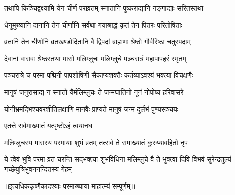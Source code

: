 \twolineshloka
{तथापि किञ्चिद्वक्ष्यामि येन चीर्ण पराव्रतम्}
{स्नातानि पुष्कराद्यानि गङ्गाद्याः सरितस्तथा} %

\twolineshloka
{धेनुमुख्यानि दानानि तेन चीर्णानि सर्वथा}
{गयाश्राद्धं कृतं तेन पितरः परितोषिताः} %

\twolineshloka
{व्रतानि तेन चीर्णानि व्रतखण्डोदितानि वै}
{द्विपदां ब्राह्मणः श्रेष्ठो गौर्वरिष्ठा चतुस्पदाम्} %

\twolineshloka
{देवानां वासवः श्रेष्ठस्तथा मासो मलिम्लुचः}
{मलिम्लुचे पञ्चरात्रं महापापहरं स्मृतम्} %

\twolineshloka
{पञ्चरात्रे च परमा पद्मिनी पापशोषिणी}
{सैकाप्यशक्तैः कर्तव्याऽवश्यं भक्त्या विचक्षणैः} %

\twolineshloka
{मानुषं जनुरासाद्य न स्नातो यैर्मलिम्लुचः}
{ते जन्मघातिनो नूनं नोपोष्य हरिवासरे} %

\twolineshloka
{योनीभ्रमद्भिश्चवरशीतिलक्षाणि मानवैः}
{प्राप्यते मानुषं जन्म दुर्लभं पुण्यसञ्चयः} %



\onelineshloka
{एतत्ते सर्वमाख्यातं यत्पृष्टोऽहं त्वयानघ} %

\twolineshloka
{मलिम्लुचस्य मासस्य परमायाः शुभं व्रतम्}
{तत्सर्व ते समाख्यातं कुरुप्यावहितो नृप} %

\twolineshloka
{ये त्वेवं भुवि परमा व्रतं चरन्ति सद्भक्त्या शुभविधिना मलिम्लुचे वै}
{ते भुक्त्वा दिवि विभवं सुरेन्द्रतुल्यं गच्छेयुत्रिभुवननन्दितस्य गेहम्} %

॥इत्यधिककृष्णैकादश्याः परमाख्याया माहात्म्यं सम्पूर्णम्॥

\hyperref[sec:ekadashi_mahatmyam_vrata_raja]{\closesub}